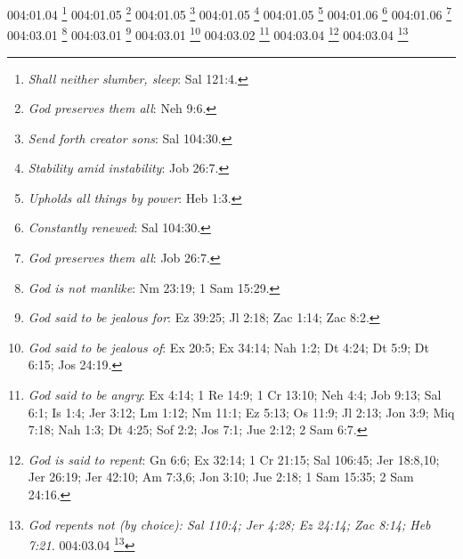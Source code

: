 {{{{{{{{{{{{004:01.04 \footnote{\textit{Shall neither slumber, sleep}: Sal 121:4.}
004:01.05 \footnote{\textit{God preserves them all}: Neh 9:6.}
004:01.05 \footnote{\textit{Send forth creator sons}: Sal 104:30.}
004:01.05 \footnote{\textit{Stability amid instability}: Job 26:7.}
004:01.05 \footnote{\textit{Upholds all things by power}: Heb 1:3.}
004:01.06 \footnote{\textit{Constantly renewed}: Sal 104:30.}
004:01.06 \footnote{\textit{God preserves them all}: Job 26:7.}
004:03.01 \footnote{\textit{God is not manlike}: Nm 23:19; 1 Sam 15:29.}
004:03.01 \footnote{\textit{God said to be jealous for}: Ez 39:25; Jl 2:18; Zac 1:14; Zac 8:2.}
004:03.01 \footnote{\textit{God said to be jealous of}: Ex 20:5; Ex 34:14; Nah 1:2; Dt 4:24; Dt 5:9; Dt 6:15; Jos 24:19.}
004:03.02 \footnote{\textit{God said to be angry}: Ex 4:14; 1 Re 14:9; 1 Cr 13:10; Neh 4:4; Job 9:13; Sal 6:1; Is 1:4; Jer 3:12; Lm 1:12; Nm 11:1; Ez 5:13; Os 11:9; Jl 2:13; Jon 3:9; Miq 7:18; Nah 1:3; Dt 4:25; Sof 2:2; Jos 7:1; Jue 2:12; 2 Sam 6:7.}
004:03.04 \footnote{\textit{God is said to repent}: Gn 6:6; Ex 32:14; 1 Cr 21:15; Sal 106:45; Jer 18:8,10; Jer 26:19; Jer 42:10; Am 7:3,6; Jon 3:10; Jue 2:18; 1 Sam 15:35; 2 Sam 24:16.}
004:03.04 \footnote{\textit{God repents not (by choice): Sal 110:4; Jer 4:28; Ez 24:14; Zac 8:14; Heb 7:21.}
004:03.04 \footnote{\textit{God repents not (by nature): Nm 23:19; 1 Sam 15:29.}
004:04.02 \footnote{\textit{God changes not}: Mal 3:6; Stg 1:17.}
004:04.09 \footnote{\textit{Victory through faith}: 1 Jn 5:4.}
004:05.03 \footnote{\textit{Floods as punishment}: Gn 6:6 ff.}
004:05.03 \footnote{\textit{God's rampage in storms}: Is 28:2; Is 29:6.}
004:05.03 \footnote{\textit{Natural catastrophies as curse}: Ez 5:16-17.}
004:05.03 \footnote{\textit{Strike down people in anger}: 1 Cr 13:10; Hch 5:1-10.}
004:05.03 \footnote{\textit{Who shake earth in wrath}: Nah 1:2-6.}
004:05.05 \footnote{\textit{Without blood, no remission}: Heb 9:22.}
005:02.02 \footnote{\textit{Bosom of the Father}: Jn 1:18.}
005:02.02 \footnote{\textit{Right hand of the Father}: Sal 110:1; Mt 22:43-44; Mc 12:36; Mc 16:19; Lc 20:42; Hch 7:55-56; Ro 8:34; Col 3:1; Heb 1:3; Heb 8:1; Heb 10:12; Heb 12:2; 1 P 3:22.}
005:02.03 \footnote{\textit{God's spirit within you}: Job 32:8,18; Is 63:10-11; Ez 37:14; Mt 10:20; Lc 17:21; Jn 17:21-23; Ro 8:9-11; 1 Co 3:16-17; 1 Co 6:19; 2 Co 6:16; Gl 2:20; 1 Jn 3:24; 1 Jn 4:12-15; Ap 21:3.}
005:02.04 \footnote{\textit{By their fruits know them}: Mt 7:16-20; Lc 6:43-44; Gl 5:22-23; Ef 5:9.}
005:04.02 \footnote{\textit{Lasting peace}: Sal 119:165; Is 26:3; Nm 6:26; Lc 1:79; Lc 2:14; Jn 14:27; Jn 16:33; Ro 14:17; 1 Co 14:33; Flp 4:7.}
}}}}}}}}}}}}}}

